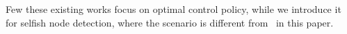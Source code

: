 %

Few these existing works focus on
optimal control policy, while we introduce it
for selfish node detection,
where the scenario is different from~\cite{DBLP:journals/tcss/WuDH18} in this paper.
